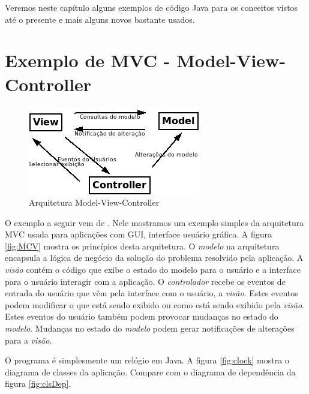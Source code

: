 \documentclass[
	11pt,				%
	openright,
	twoside,			%
	a4paper,			%
	english,			%
	french,
	brazil,				%
	sumario=tradicional
	]{abntex2}
\begin{document}
Veremos neste capítulo alguns exemplos de código Java para os conceitos vistos até o presente e mais alguns novos bastante usados.

\section{Exemplo de MVC - Model-View-Controller}

\begin{figure}[h]
\begin{center}
\includegraphics[scale=0.7]{MVC.png} 
\caption{Arquitetura Model-View-Controller} \label{fig:mvc}
\end{center}
\end{figure}

O exemplo a seguir vem de . Nele mostramos um exemplo simples da arquitetura MVC usada para aplicações com GUI, interface usuário gráfica. A figura \ref{fig:MCV} mostra os princípios desta arquitetura. O \emph{modelo} na arquitetura encapsula a lógica de negócio da solução do problema resolvido pela aplicação. A \emph{visão} contém o código que exibe o estado do modelo para o usuário e a interface para o usuário interagir com a aplicação. O \emph{controlador} recebe os eventos de entrada do usuário que vêm pela interface com o usuário, a \emph{visão}. Estes eventos podem modificar o que está sendo exibido ou como está sendo exibido pela \emph{visão}. Estes eventos do usuário também podem provocar mudanças no estado do \emph{modelo}. Mudanças no estado do \emph{modelo} podem gerar notificações de alterações para a \emph{visão}.

O programa é simplesmente um relógio em Java. A figura \ref{fig:clock} mostra o diagrama de classes da aplicação. Compare com o diagrama de dependência da figura \ref{fig:clsDep}.
\end{document}
